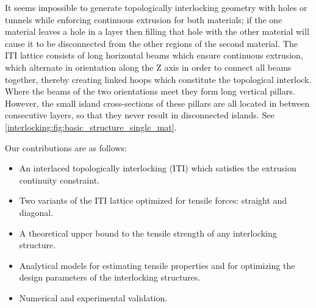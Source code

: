 It seems impossible to generate topologically interlocking geometry with holes or tunnels while enforcing continuous extrusion for both materials;
if the one material leaves a hole in a layer then filling that hole with the other material will cause it to be disconnected from the other regions of the second material.
The ITI lattice consists of long horizontal beams which ensure continuous extrusion, which alternate in orientation along the Z axis in order to connect all beams together, thereby creating linked hoops which constitute the topological interlock.
Where the beams of the two orientations meet they form long vertical pillars. %
However, the small island cross-sections of these pillars are all located in between consecutive layers, so that they never result in disconnected islands.
See \cref{interlocking:fig:basic_structure_single_mat}.


Our contributions are as follows:
\begin{itemize}
	\item An interlaced topologically interlocking  (ITI) which satisfies the extrusion continuity constraint.
	\item Two variants of the ITI lattice optimized for tensile forces: straight and diagonal.
	\item A theoretical upper bound to the tensile strength of any interlocking structure.
	\item Analytical models for estimating tensile properties and for optimizing the design parameters of the interlocking structures.
	\item Numerical and experimental validation.
\end{itemize}






